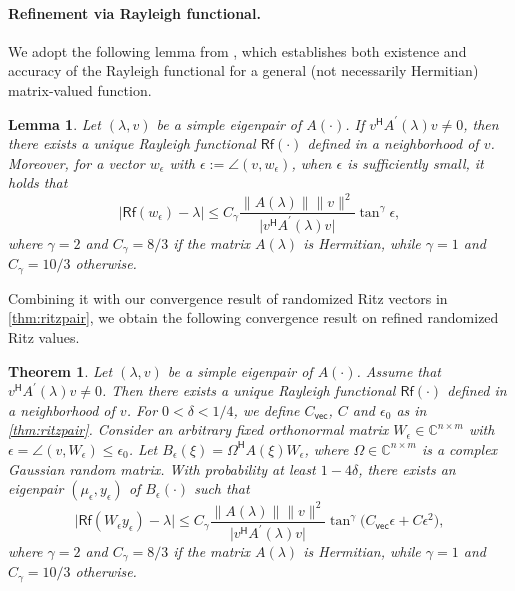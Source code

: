 \documentclass[a4paper,11pt]{article}
\newtheorem{theorem}{Theorem}
\newtheorem{lemma}{Lemma}
\newcommand{\Htran}{\mathsf{H}}
\newcommand{\Rq}{\mathsf{Rf}}
\newcommand{\defi}{:=}
\newcommand{\C}{\mathbb{C}}
\newcommand{\Crvec}{C_{\mathsf{vec}}}
\providecommand{\abs}[1]{\lvert#1\rvert}
\providecommand{\norm}[1]{\lVert#1\rVert}
\begin{document}
\paragraph{Refinement via Rayleigh functional.} 
\!We adopt the following lemma from \cite[Cor.~18 and Thm.~21]{Schwetlick2012}, which establishes both existence and accuracy of the Rayleigh functional for a general (not necessarily Hermitian) matrix-valued function.
\begin{lemma}
    Let $(\lambda,v)$ be a simple eigenpair of $A(\cdot)$. 
    If $v^{\Htran}A^{\prime}(\lambda)v\neq 0$, then there exists a unique Rayleigh functional $\Rq(\cdot)$ defined in a neighborhood of $v$. Moreover, for a vector $w_{\epsilon}$ with $\epsilon\defi\angle(v,w_{\epsilon})$, when $\epsilon$ is sufficiently small, it holds that 
    \begin{equation*}
        \abs{\Rq(w_{\epsilon}) - \lambda}
        \leq C_{\gamma}
        \frac{\norm{A(\lambda)}\norm{v}^{2}}{\abs{v^{\Htran}A^{\prime}(\lambda)v}}\tan^{\gamma}\epsilon,
    \end{equation*}
    where $\gamma = 2$ and $C_{\gamma} = 8/3$ if the matrix $A(\lambda)$ is Hermitian, while $\gamma = 1$ and $C_{\gamma} = 10/3$ otherwise.
\end{lemma}


Combining it with our convergence result of randomized Ritz vectors in \cref{thm:ritzpair}, we obtain the following convergence result on refined randomized Ritz values.


\begin{theorem}
    \label{thm:Rf}
    Let $(\lambda,v)$ be a simple eigenpair of $A(\cdot)$.
    Assume that $v^{\Htran}A^{\prime}(\lambda)v\neq 0$. Then there exists a unique Rayleigh functional $\Rq(\cdot)$ defined in a neighborhood of $v$.
    For $0<\delta<1/4$, we define $\Crvec$, $C$ and $\epsilon_{0}$ as in \cref{thm:ritzpair}. 
    Consider an arbitrary fixed orthonormal matrix $W_{\epsilon}\in\C^{n\times m}$ with $\epsilon=\angle(v,W_{\epsilon})\leq \epsilon_{0}$.
    Let $B_{\epsilon}(\xi)=\Omega^{\Htran}A(\xi)W_{\epsilon}$, where $\Omega\in\C^{n\times m}$ is a complex Gaussian random matrix. With probability at least $1-4\delta$, there exists an eigenpair $(\mu_{\epsilon},y_{\epsilon})$ of $B_{\epsilon}(\cdot)$ such that
    \begin{equation*}
        \abs{\Rq(W_{\epsilon}y_{\epsilon})-\lambda}\leq  
        C_{\gamma}\frac{\norm{A(\lambda)}\norm{v}^{2}}{\abs{v^{\Htran}A^{\prime}(\lambda)v}}
        \tan^{\gamma} \bigl(\Crvec \epsilon+C\epsilon^{2}\bigr),
    \end{equation*}
    where $\gamma = 2$ and $C_{\gamma} = 8/3$ if the matrix $A(\lambda)$ is Hermitian, while $\gamma = 1$ and $C_{\gamma} = 10/3$ otherwise.
\end{theorem}
\end{document}
